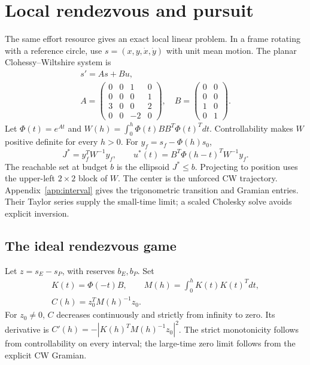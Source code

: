 \section{Local rendezvous and pursuit}
\label{sec:cw}
The same effort resource gives an exact local linear problem. In a frame
rotating with a reference circle, use
$s=(x,y,\dot x,\dot y)$ with unit mean motion. The planar
Clohessy--Wiltshire system \cite{ClohessyWiltshire1960} is
\begin{equation}
 \begin{gathered}
 s'=As+Bu,\\
 A=\begin{pmatrix}
 0&0&1&0\\0&0&0&1\\3&0&0&2\\0&0&-2&0
 \end{pmatrix},\quad B=\begin{pmatrix}0&0\\0&0\\1&0\\0&1\end{pmatrix}.
 \end{gathered}
\end{equation}
Let $\Phi(t)=e^{At}$ and
$W(h)=\int_0^h\Phi(t)BB^T\Phi(t)^Tdt$.
Controllability makes $W$ positive definite for every $h>0$.
For $y_f=s_f-\Phi(h)s_0$,
\begin{equation}
 J^*=y_f^TW^{-1}y_f,\qquad
 u^*(t)=B^T\Phi(h-t)^TW^{-1}y_f.
 \label{eq:cwcost}
\end{equation}
The reachable set at budget $b$ is the ellipsoid $J^*\le b$.
Projecting to position uses the upper-left $2\times2$ block of $W$.
The center is the unforced CW trajectory. Appendix~\ref{app:interval} gives the trigonometric transition and
Gramian entries. Their Taylor series supply the small-time limit;
a scaled Cholesky solve avoids explicit inversion.

\subsection{The ideal rendezvous game}
Let $z=s_E-s_P$, with reserves $b_E,b_P$. Set
\begin{equation}
 \begin{gathered}
 K(t)=\Phi(-t)B,\qquad M(h)=\int_0^hK(t)K(t)^Tdt,\\
 C(h)=z_0^TM(h)^{-1}z_0.
 \end{gathered}
\end{equation}
For $z_0\ne0$, $C$ decreases continuously and strictly from infinity
to zero. Its derivative is
$C'(h)=-|K(h)^TM(h)^{-1}z_0|^2$.
The strict monotonicity follows from controllability on every interval;
the large-time zero limit follows from the explicit CW Gramian.

